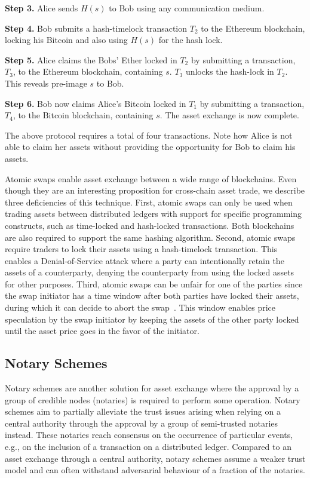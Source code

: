 \textbf{Step 3.} Alice sends $ H(s) $ to Bob using any communication medium.

\textbf{Step 4.} Bob submits a hash-timelock transaction $ T_2 $ to the Ethereum blockchain, locking his Bitcoin and also using $ H(s) $ for the hash lock.

\textbf{Step 5.} Alice claims the Bobs' Ether locked in $ T_2 $ by submitting a transaction, $ T_3 $, to the Ethereum blockchain, containing $ s $. $ T_3 $ unlocks the hash-lock in $ T_2 $. This reveals pre-image $ s $ to Bob.

\textbf{Step 6.} Bob now claims Alice's Bitcoin locked in $ T_1 $ by submitting a transaction, $ T_4 $, to the Bitcoin blockchain, containing $ s $. The asset exchange is now complete.

The above protocol requires a total of four transactions.
Note how Alice is not able to claim her assets without providing the opportunity for Bob to claim his assets.

Atomic swaps enable asset exchange between a wide range of blockchains.
Even though they are an interesting proposition for cross-chain asset trade, we describe three deficiencies of this technique.
First, atomic swaps can only be used when trading assets between distributed ledgers with support for specific programming constructs, such as time-locked and hash-locked transactions.
Both blockchains are also required to support the same hashing algorithm.
Second, atomic swaps require traders to lock their assets using a hash-timelock transaction.
This enables a Denial-of-Service attack where a party can intentionally retain the assets of a counterparty, denying the counterparty from using the locked assets for other purposes.
Third, atomic swaps can be unfair for one of the parties since the swap initiator has a time window after both parties have locked their assets, during which it can decide to abort the swap~\cite{han2019optionality}.
This window enables price speculation by the swap initiator by keeping the assets of the other party locked until the asset price goes in the favor of the initiator.

\subsection{Notary Schemes}
\label{sec:notary_schemes}
Notary schemes are another solution for asset exchange where the approval by a group of credible nodes (notaries) is required to perform some operation.
Notary schemes aim to partially alleviate the trust issues arising when relying on a central authority through the approval by a group of semi-trusted notaries instead.
These notaries reach consensus on the occurrence of particular events, e.g., on the inclusion of a transaction on a distributed ledger.
Compared to an asset exchange through a central authority, notary schemes assume a weaker trust model and can often withstand adversarial behaviour of a fraction of the notaries.

